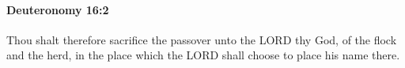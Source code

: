 
		\paragraph{Deuteronomy 16:2} %
			\label{DEUTERONOMY-16-2}

			Thou shalt therefore sacrifice the passover unto the LORD thy God, of the flock and the herd, in the place which the LORD shall choose to place his name there.


